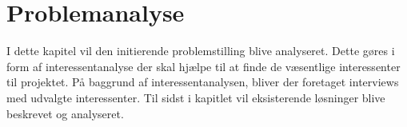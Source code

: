 \chapter{Problemanalyse}
I dette kapitel vil den initierende problemstilling blive analyseret. Dette gøres i form af interessentanalyse der skal hjælpe til at finde de væsentlige interessenter til projektet. På baggrund af interessentanalysen, bliver der foretaget interviews med udvalgte interessenter. Til sidst i kapitlet vil eksisterende løsninger blive beskrevet og analyseret.